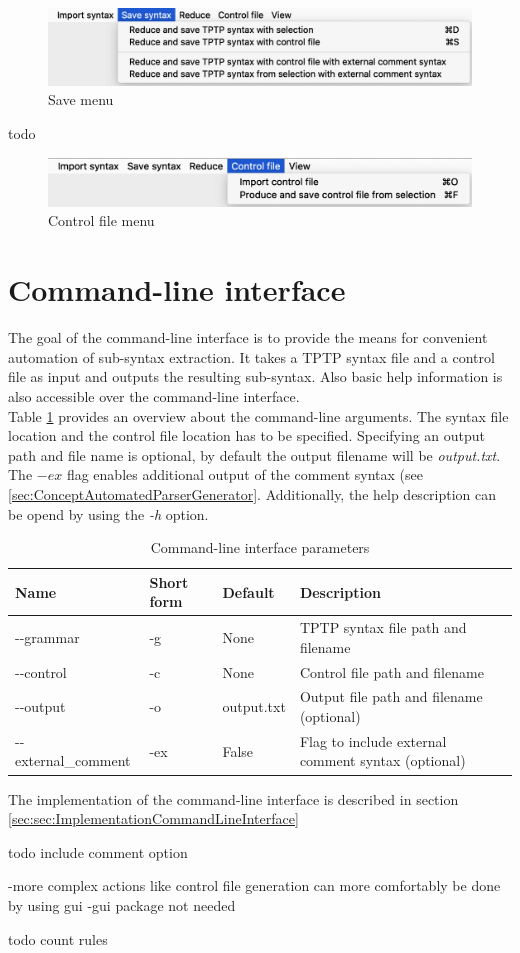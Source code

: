 \begin{figure}[H]
\centering
\includegraphics[width=.7\textwidth]{images/save.png}
\caption{Save menu}
\label{fig:save}
\end{figure}

todo
\begin{figure}[H]
\centering
\includegraphics[width=.7\textwidth]{images/control_file_menu.png}
\caption{Control file menu}
\label{fig:ControlFileMenu}
\end{figure}

\section{Command-line interface}\label{sec:ConceptCommandLineInterface}
The goal of the command-line interface is to provide the means for convenient automation of sub-syntax extraction.
It takes a \ac{TPTP} syntax file and a control file as input and outputs the resulting sub-syntax.
Also basic help information is also accessible over the command-line interface.\\
Table \ref{tbl:ImplementationCommandLineParameters} provides an overview about the command-line arguments.
The syntax file location and the control file location has to be specified.
Specifying an output path and file name is optional, by default the output filename will be \textit{output.txt}.
The $-ex$ flag enables additional output of the comment syntax (see \ref{sec:ConceptAutomatedParserGenerator}.
Additionally, the help description can be opend by using the \textit{-h} option.
\begin{table}[H]
\centering
\caption{Command-line interface parameters}
\begin{adjustbox}{width=1\textwidth, center=\textwidth}
\renewcommand{\arraystretch}{2}
\begin{tabular}{llll}
\textbf{Name} & \textbf{Short form} & \textbf{Default} & \textbf{Description}\\\hline
-{}-grammar & -g & None & \ac{TPTP} syntax file path and filename\\
-{}-control & -c & None &  Control file path and filename\\
-{}-output & -o & output.txt & Output file path and filename (optional)\\
-{}-external\_comment & -ex & False & Flag to include external comment syntax (optional)
\end{tabular}
\end{adjustbox}
\label{tbl:ImplementationCommandLineParameters}
\end{table}

The implementation of the command-line interface is described in section \ref{sec:sec:ImplementationCommandLineInterface}

todo include comment option

 
-more complex actions like control file generation can more comfortably be done by using gui
-gui package not needed

todo count rules